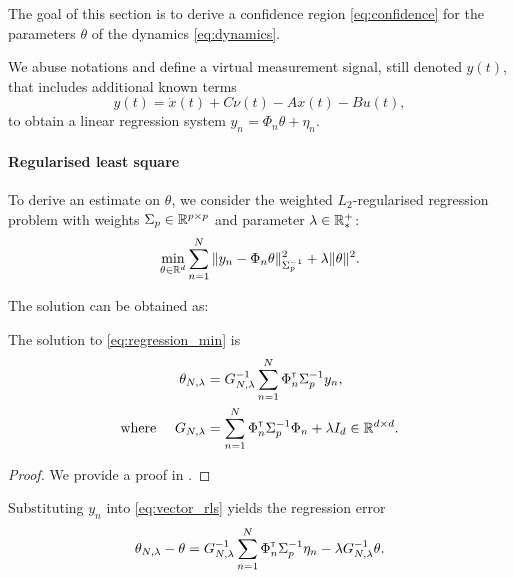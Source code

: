 The goal of this section is to derive a confidence region \eqref{eq:confidence} for the parameters $\theta$ of the dynamics \eqref{eq:dynamics}.

We abuse notations and define a virtual measurement signal, still denoted $y(t)$, that includes additional known terms
\begin{equation*}
y(t) = \dot{x}(t) + C\nu(t) - A x(t) - Bu(t),
\end{equation*}
to obtain a linear regression system
$
y_n = \Phi_n\theta + \eta_n.
$

\paragraph{Regularised least square} To derive an estimate on $\theta$, we consider the weighted $L_2$-regularised regression problem with weights $\Sigma_p\in\mathbb{R}^{p\times p}$ and parameter $\lambda\in\mathbb{R}^+_*$:
\begin{equation}
\label{eq:regression_min}
\min_{\theta\in\mathbb{R}^d} \sum_{n=1}^N \|y_n -\Phi_n\theta\|_{\Sigma_p^{-1}}^2 + \lambda\|\theta\|_{}^2.
\end{equation}


The solution can be obtained as:

\begin{proposition}
	\label{prop:regularized_solution}
	\begin{leftbar}[propositionbar]
	The solution to \eqref{eq:regression_min} is
	\begin{align}
	\label{eq:vector_rls}
	\theta_{N,\lambda} &= G_{N, \lambda}^{-1} \sum_{n=1}^N \Phi_n^{\mathsf{\scriptscriptstyle T}} \Sigma_p^{-1} y_n,\\
	\label{eq:g_n_lambda}
	\text{where }\quad G_{N, \lambda} &= \sum_{n=1}^N \Phi_{n}^{\mathsf{\scriptscriptstyle T}}\Sigma_p^{-1}\Phi_{n}  + \lambda I_d \in \mathbb{R}^{d\times d}.
	\end{align}
	\end{leftbar}
\end{proposition}
\begin{proof}
	We provide a proof in .
\end{proof}

Substituting $y_n$ into \eqref{eq:vector_rls} yields the regression error
\begin{align}
\theta_{N,\lambda} - \theta = G_{N, \lambda}^{-1}\sum_{n=1}^N \Phi_n^{\mathsf{\scriptscriptstyle T}} \Sigma_p^{-1}\eta_n - \lambda G_{N, \lambda}^{-1}\theta.
\end{align}


